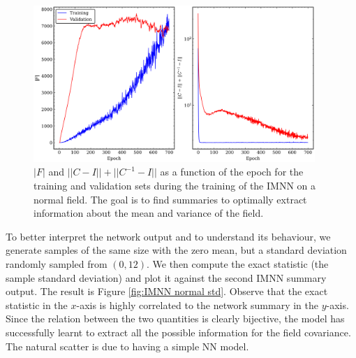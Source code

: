 \begin{figure}
    \centering
    \includegraphics[width=0.95\textwidth]{img/ML/normal_plot_training.png}
    \caption{$|F|$ and $||C-I||+||C^{-1}-I||$ as a function of the epoch for the training and validation sets during the training of the IMNN on a normal field. The goal is to find summaries to optimally extract information about the mean and variance of the field.}
    \label{fig:IMNN training normal test}
\end{figure}

To better interpret the network output and to understand its behaviour, we generate samples of the same size with the zero mean, but a standard deviation randomly sampled from $(0,12)$. We then compute the exact statistic (the sample standard deviation) and plot it against the second IMNN summary output. The result is Figure \ref{fig:IMNN normal std}. Observe that the exact statistic in the $x$-axis is highly correlated to the network summary in the $y$-axis. Since the relation between the two quantities is clearly bijective, the model has successfully learnt to extract all the possible information for the field covariance. The natural scatter is due to having a simple NN model.

